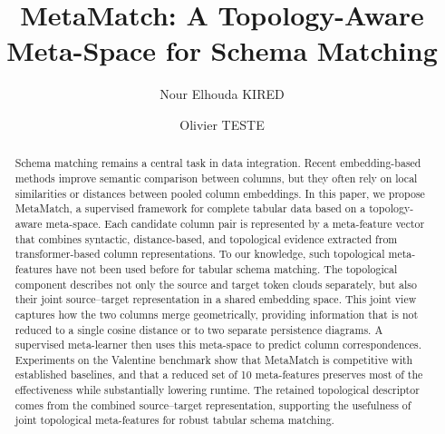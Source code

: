 \documentclass[sigconf, nonacm]{acmart}
\begin{document}
\title{MetaMatch: A Topology-Aware Meta-Space for Schema Matching}

\author{Nour Elhouda KIRED}



\author{Olivier TESTE}

\begin{abstract}
Schema matching remains a central task in data integration. Recent embedding-based methods improve semantic comparison between columns, but they often rely on local similarities or distances between pooled column embeddings. In this paper, we propose MetaMatch, a supervised framework for complete tabular data based on a topology-aware meta-space. Each candidate column pair is represented by a meta-feature vector that combines syntactic, distance-based, and topological evidence extracted from transformer-based column representations. To our knowledge, such topological meta-features have not been used before for tabular schema matching. The topological component describes not only the source and target token clouds separately, but also their joint source--target representation in a shared embedding space. This joint view captures how the two columns merge geometrically, providing information that is not reduced to a single cosine distance or to two separate persistence diagrams. A supervised meta-learner then uses this meta-space to predict column correspondences. Experiments on the Valentine benchmark show that MetaMatch is competitive with established baselines, and that a reduced set of 10 meta-features preserves most of the effectiveness while substantially lowering runtime. The retained topological descriptor comes from the combined source--target representation, supporting the usefulness of joint topological meta-features for robust tabular schema matching.
\end{abstract}


\maketitle
\end{document}
